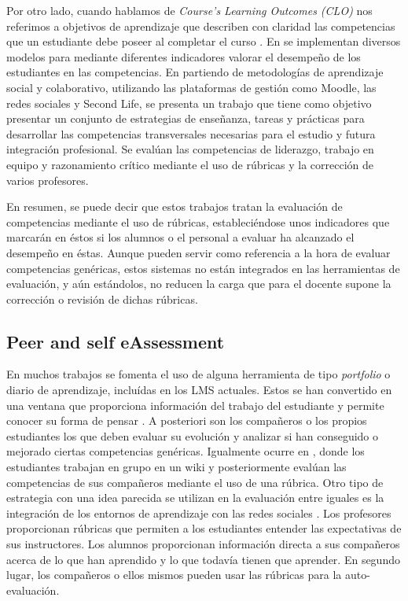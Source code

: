 Por otro lado, cuando hablamos de \emph{Course’s Learning Outcomes (CLO)} nos referimos a objetivos de aprendizaje que describen con claridad las competencias que un estudiante debe poseer al completar el curso \cite{SimonTaylor:2009, Anderson:2001,Kennedy:2007}. En \cite {Mohamed:2008,Mohamed:2008a,Rashid:2008} se implementan diversos modelos para mediante diferentes indicadores valorar el desempeño de los estudiantes en las competencias. En \cite{MercedesRico:2013} partiendo de metodologías de aprendizaje social y colaborativo, utilizando las plataformas de gestión como Moodle, las redes sociales y Second Life, se presenta un trabajo que tiene como objetivo presentar un conjunto de estrategias de enseñanza, tareas y prácticas para desarrollar las competencias transversales necesarias para el estudio y futura integración profesional. Se evalúan las competencias de liderazgo, trabajo en equipo y razonamiento crítico mediante el uso de rúbricas y la corrección de varios profesores.

En resumen, se puede decir que estos trabajos tratan la evaluación de competencias mediante el uso de rúbricas, estableciéndose unos indicadores que marcarán en éstos si los alumnos o el personal a evaluar ha alcanzado el desempeño en éstas. Aunque pueden servir como referencia a la hora de evaluar competencias genéricas, estos sistemas no están integrados en las herramientas de evaluación, y aún estándolos, no reducen la carga que para el docente supone la corrección o revisión de dichas rúbricas.

\subsection{Peer and self eAssessment}

En muchos trabajos se fomenta el uso de alguna herramienta de tipo \emph{portfolio} o diario de aprendizaje, incluídas en los LMS actuales. Estos se han convertido en una ventana que proporciona información del trabajo del estudiante y permite conocer su forma de pensar \cite{Palomares:2011,Gil:2011}. A posteriori son los compañeros o los propios estudiantes los que deben evaluar su evolución y analizar si han conseguido o mejorado ciertas competencias genéricas. Igualmente ocurre en \cite{Lim:2011}, donde los estudiantes trabajan en grupo en un wiki y posteriormente evalúan las competencias de sus compañeros mediante el uso de una rúbrica. Otro tipo de estrategia con una idea parecida se utilizan en la evaluación entre iguales es la integración de los entornos de aprendizaje con las redes sociales \cite{Piedra:2010,McLoughlin:2006,Shih:2011}. Los profesores proporcionan rúbricas que permiten a los estudiantes entender las expectativas de sus instructores. Los alumnos proporcionan información directa a sus compañeros acerca de lo que han aprendido y lo que todavía tienen que aprender. En segundo lugar, los compañeros o ellos mismos pueden usar las rúbricas para la auto-evaluación. 

